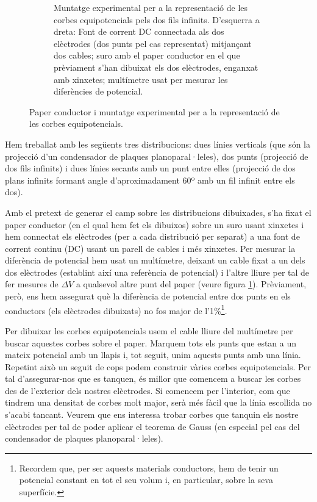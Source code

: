 \documentclass[a4paper,10.5pt]{report}
\begin{document}
\begin{figure}[h]
\begin{subfigure}{0.45\textwidth}
		\caption{Muntatge experimental per a la representació de les corbes equipotencials pels dos fils infinits. D'esquerra a dreta: Font de corrent DC connectada als dos elèctrodes (dos punts pel cas representat) mitjançant dos cables; suro amb el paper conductor en el que prèviament s'han dibuixat els dos elèctrodes, enganxat amb xinxetes; multímetre usat per mesurar les diferències de potencial.}
		\label{fig1.1b}
	\end{subfigure}
	\caption{Paper conductor i muntatge experimental per a la representació de les corbes equipotencials.}
	\label{fig1.1}
\end{figure}

Hem treballat amb les següents tres distribucions: dues línies verticals (que són la projecció d'un condensador de plaques planoparal·leles), dos punts (projecció de dos fils infinits) i dues línies secants amb un punt entre elles (projecció de dos plans infinits formant angle d'aproximadament 60º amb un fil infinit entre els dos).

Amb el pretext de generar el camp sobre les distribucions dibuixades, s'ha fixat el paper conductor (en el qual hem fet els dibuixos) sobre un suro usant xinxetes i hem connectat els elèctrodes (per a cada distribució per separat) a una font de corrent continu (DC) usant un parell de cables i més xinxetes. Per mesurar la diferència de potencial hem usat un multímetre, deixant un cable fixat a un dels dos elèctrodes (establint així una referència de potencial) i l'altre lliure per tal de fer mesures de $\Delta V$ a qualsevol altre punt del paper (veure figura \ref{fig1.1b}). Prèviament, però, ens hem assegurat què la diferència de potencial entre dos punts en els conductors (els elèctrodes dibuixats) no fos major de l'1\%\footnote{Recordem que, per ser aquests materials conductors, hem de tenir un potencial constant en tot el seu volum i, en particular, sobre la seva superfície.}.

Per dibuixar les corbes equipotencials usem el cable lliure del multímetre per buscar aquestes corbes sobre el paper. Marquem tots els punts que estan a un mateix potencial amb un llapis i, tot seguit, unim aquests punts amb una línia. Repetint això un seguit de cops podem construir vàries corbes equipotencials. Per tal d'assegurar-nos que es tanquen, és millor que comencem a buscar les corbes des de l'exterior dels nostres elèctrodes. Si comencem per l'interior, com que tindrem una densitat de corbes molt major, serà més fàcil que la línia escollida no s'acabi tancant. Veurem que ens interessa trobar corbes que tanquin els nostre elèctrodes per tal de poder aplicar el teorema de Gauss (en especial pel cas del condensador de plaques planoparal·leles).
\end{document}

